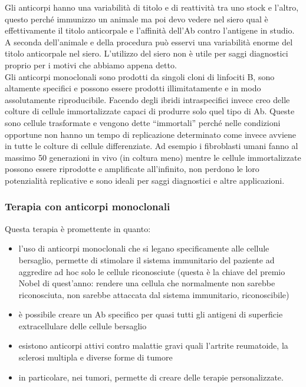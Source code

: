 \documentclass[11pt]{book}
\begin{document}
Gli anticorpi hanno una variabilità di titolo e di reattività tra uno stock e l’altro, questo perché immunizzo un animale ma poi devo vedere nel siero qual è effettivamente il titolo anticorpale e l’affinità dell’Ab contro l’antigene in studio. A seconda dell’animale e della procedura può esservi una variabilità enorme del titolo anticorpale nel siero. L’utilizzo del siero non è utile per saggi diagnostici proprio per i motivi che abbiamo appena detto.\\
Gli anticorpi monoclonali sono prodotti da singoli cloni di linfociti B, sono altamente specifici e possono essere prodotti illimitatamente e in modo assolutamente riproducibile. Facendo degli ibridi intraspecifici invece creo delle colture di cellule immortalizzate capaci di produrre solo quel tipo di Ab. Queste sono cellule trasformate e vengono dette ``immortali'' perché nelle condizioni opportune non hanno un tempo di replicazione determinato come invece avviene in tutte le colture di cellule differenziate. Ad esempio i fibroblasti umani fanno al massimo 50 generazioni in vivo (in coltura meno) mentre le cellule immortalizzate possono essere riprodotte e amplificate all’infinito, non perdono le loro potenzialità replicative e sono ideali per saggi diagnostici e altre applicazioni.

\clearpage
\subsubsection{Terapia con anticorpi monoclonali}
Questa terapia è promettente in quanto:
\begin{itemize}
\item l'uso di anticorpi monoclonali che si legano specificamente alle cellule bersaglio, permette di stimolare il sistema immunitario del paziente ad aggredire ad hoc solo le cellule riconosciute (questa è la chiave del premio Nobel di quest’anno: rendere una cellula che normalmente non sarebbe riconosciuta, non sarebbe attaccata dal sistema immunitario, riconoscibile)
\item è possibile creare un Ab specifico per quasi tutti gli antigeni di superficie extracellulare delle cellule bersaglio
\item esistono anticorpi attivi contro malattie gravi quali l'artrite reumatoide, la sclerosi multipla e diverse forme di tumore
\item in particolare, nei tumori, permette di creare delle terapie personalizzate.
\end{itemize}
\end{document}
